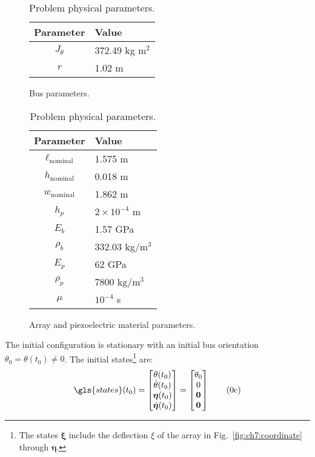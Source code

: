 \begin{table}[t]
\centering
\begin{subfigure}[t]{0.5\textwidth}
    \centering
    \caption{Bus parameters.}
	\begin{tabular}{cl}
	\hline \hline
	Parameter & Value \\
	\hline
	$J_{\theta}$ & 372.49 kg m$^2$  \\
	$r$ & 1.02 m  \\
	\hline \hline
	\end{tabular}
\end{subfigure}%
\begin{subfigure}[t]{0.5\textwidth}
    \centering
	\caption{Array and piezoelectric material parameters.}
	\begin{tabular}{cl}
	\hline \hline
	Parameter & Value \\
	\hline
	$\ell_{\text{nominal}}$ & 1.575 m \\
	$h_{\text{nominal}}$ & 0.018 m \\
	$w_{\text{nominal}}$ & 1.862 m \\
	$h_p$ & $2 \times 10^{-4}$ m \\
	$E_b$ & 1.57 GPa \\
	$\rho_b$ & 332.03 kg/m$^3$ \\
	$E_p$ & 62 GPa \\
	$\rho_p$ & 7800 kg/m$^3$ \\
	$\mu$ & $10^{-4}$ s \\
	\hline \hline
	\end{tabular}
\end{subfigure}%

\caption{Problem physical parameters.} \label{tb:ch7:parameters}

\end{table}

\noindent The initial configuration is stationary with an initial bus orientation $\theta_0=\theta(t_0)\neq 0$. The initial states\footnote{The states $\bm{\xi}$ include the deflection $\xi$ of the array in Fig.~\ref{fig:ch7:coordinate} through $\bm{\eta}$.} are:
\begin{align}
\gls{states}(t_0) =
\begin{bmatrix}
\theta(t_0) \\ \dot{\theta}(t_0) \\  \bm{\eta}(t_0) \\ \dot{\bm{\eta}}(t_0)
\end{bmatrix} =
\begin{bmatrix}
\theta_0 \\ 0 \\ \bm{0} \\ \bm{0}
\end{bmatrix} \tag{\theequation c}  \label{eq:ch7:init_condition}
\end{align}

